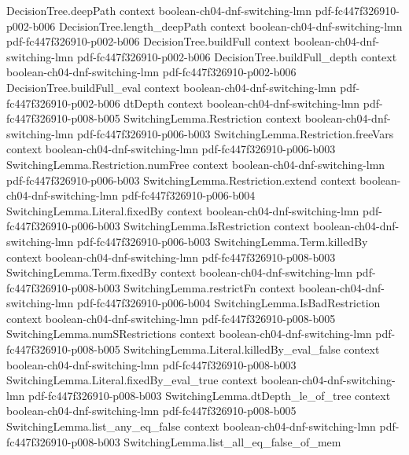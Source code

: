 \begin{lemma}
\proofstep
  {DecisionTree.deepPath}
  {context}
  {boolean-ch04-dnf-switching-lmn}
  {pdf-fc447f326910-p002-b006}
\proofstep
  {DecisionTree.length_deepPath}
  {context}
  {boolean-ch04-dnf-switching-lmn}
  {pdf-fc447f326910-p002-b006}
\proofstep
  {DecisionTree.buildFull}
  {context}
  {boolean-ch04-dnf-switching-lmn}
  {pdf-fc447f326910-p002-b006}
\proofstep
  {DecisionTree.buildFull_depth}
  {context}
  {boolean-ch04-dnf-switching-lmn}
  {pdf-fc447f326910-p002-b006}
\proofstep
  {DecisionTree.buildFull_eval}
  {context}
  {boolean-ch04-dnf-switching-lmn}
  {pdf-fc447f326910-p002-b006}
\proofstep
  {dtDepth}
  {context}
  {boolean-ch04-dnf-switching-lmn}
  {pdf-fc447f326910-p008-b005}
\proofstep
  {SwitchingLemma.Restriction}
  {context}
  {boolean-ch04-dnf-switching-lmn}
  {pdf-fc447f326910-p006-b003}
\proofstep
  {SwitchingLemma.Restriction.freeVars}
  {context}
  {boolean-ch04-dnf-switching-lmn}
  {pdf-fc447f326910-p006-b003}
\proofstep
  {SwitchingLemma.Restriction.numFree}
  {context}
  {boolean-ch04-dnf-switching-lmn}
  {pdf-fc447f326910-p006-b003}
\proofstep
  {SwitchingLemma.Restriction.extend}
  {context}
  {boolean-ch04-dnf-switching-lmn}
  {pdf-fc447f326910-p006-b004}
\proofstep
  {SwitchingLemma.Literal.fixedBy}
  {context}
  {boolean-ch04-dnf-switching-lmn}
  {pdf-fc447f326910-p006-b003}
\proofstep
  {SwitchingLemma.IsRestriction}
  {context}
  {boolean-ch04-dnf-switching-lmn}
  {pdf-fc447f326910-p006-b003}
\proofstep
  {SwitchingLemma.Term.killedBy}
  {context}
  {boolean-ch04-dnf-switching-lmn}
  {pdf-fc447f326910-p008-b003}
\proofstep
  {SwitchingLemma.Term.fixedBy}
  {context}
  {boolean-ch04-dnf-switching-lmn}
  {pdf-fc447f326910-p008-b003}
\proofstep
  {SwitchingLemma.restrictFn}
  {context}
  {boolean-ch04-dnf-switching-lmn}
  {pdf-fc447f326910-p006-b004}
\proofstep
  {SwitchingLemma.IsBadRestriction}
  {context}
  {boolean-ch04-dnf-switching-lmn}
  {pdf-fc447f326910-p008-b005}
\proofstep
  {SwitchingLemma.numSRestrictions}
  {context}
  {boolean-ch04-dnf-switching-lmn}
  {pdf-fc447f326910-p008-b005}
\proofstep
  {SwitchingLemma.Literal.killedBy_eval_false}
  {context}
  {boolean-ch04-dnf-switching-lmn}
  {pdf-fc447f326910-p008-b003}
\proofstep
  {SwitchingLemma.Literal.fixedBy_eval_true}
  {context}
  {boolean-ch04-dnf-switching-lmn}
  {pdf-fc447f326910-p008-b003}
\proofstep
  {SwitchingLemma.dtDepth_le_of_tree}
  {context}
  {boolean-ch04-dnf-switching-lmn}
  {pdf-fc447f326910-p008-b005}
\proofstep
  {SwitchingLemma.list_any_eq_false}
  {context}
  {boolean-ch04-dnf-switching-lmn}
  {pdf-fc447f326910-p008-b003}
\proofstep
  {SwitchingLemma.list_all_eq_false_of_mem}

\end{lemma}
